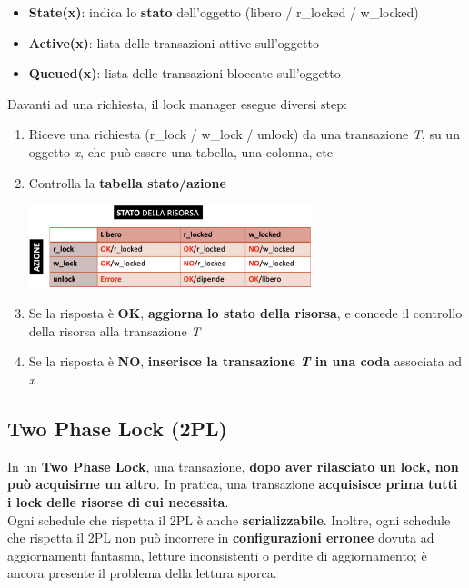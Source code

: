 \documentclass{article}
\begin{document}
\begin{itemize}[label={-}, leftmargin=1cm]
    \item \textbf{State(x)}: indica lo \textbf{stato} dell'oggetto (libero / r\_locked / w\_locked)
    \item \textbf{Active(x)}: lista delle transazioni attive sull'oggetto
    \item \textbf{Queued(x)}: lista delle transazioni bloccate sull'oggetto
\end{itemize}
Davanti ad una richiesta, il lock manager esegue diversi step:
\begin{enumerate}[leftmargin=1cm]
    \item Riceve una richiesta (r\_lock / w\_lock / unlock) da una transazione \textit{T}, su un oggetto \textit{x}, che può essere una tabella, una colonna, etc
    \item Controlla la \textbf{tabella stato/azione}
    \begin{center}
        \includegraphics[width=0.65\textwidth]{foto 6.png}
    \end{center}
    \item Se la risposta è \textbf{OK}, \textbf{aggiorna lo stato della risorsa}, e concede il controllo della risorsa alla transazione \textit{T}
    \item Se la risposta è \textbf{NO}, \textbf{inserisce la transazione \textit{T} in una coda} associata ad \textit{x}
\end{enumerate}

\subsection*{Two Phase Lock (2PL)}
\large

In un \textbf{Two Phase Lock}, una transazione, \textbf{dopo aver rilasciato un lock, non può acquisirne un altro}. In pratica, una transazione \textbf{acquisisce prima tutti i lock delle risorse di cui necessita}.\\
Ogni schedule che rispetta il 2PL è anche \textbf{serializzabile}. Inoltre, ogni schedule che rispetta il 2PL non può incorrere in \textbf{configurazioni erronee} dovuta ad aggiornamenti fantasma, letture inconsistenti o perdite di aggiornamento; è ancora presente il problema della lettura sporca.
\end{document}

